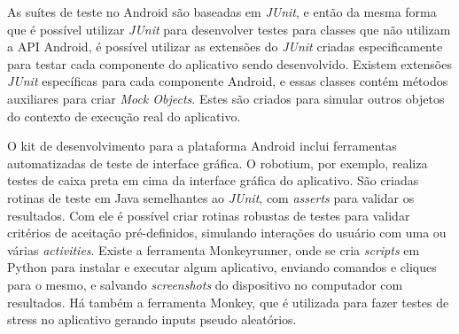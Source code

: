\begin{apendicesenv}
As suítes de teste no Android são baseadas em \textit{JUnit}, e então da mesma forma que é possível utilizar \textit{JUnit} para desenvolver testes para classes que não utilizam a API Android, é possível utilizar as extensões do \textit{JUnit} criadas especificamente para testar cada componente do aplicativo sendo desenvolvido. Existem extensões \textit{JUnit} específicas para cada componente Android, e essas classes contém métodos auxiliares para criar \textit{Mock Objects}. Estes são criados para simular outros objetos do contexto de execução real do aplicativo.

O kit de desenvolvimento para a plataforma Android inclui ferramentas automatizadas de teste de interface gráfica. O robotium, por exemplo, realiza testes de caixa preta em cima da interface gráfica do aplicativo. São criadas rotinas de teste em Java semelhantes ao \textit{JUnit}, com \textit{asserts} para validar os resultados. Com ele é possível criar rotinas robustas de testes para validar critérios de aceitação pré-definidos, simulando interações do usuário com uma ou várias \textit{activities}. Existe a ferramenta Monkeyrunner, onde se cria \textit{scripts} em Python para instalar e executar algum aplicativo, enviando comandos e cliques para o mesmo, e salvando \textit{screenshots} do dispositivo no computador com resultados. Há também a ferramenta Monkey, que é utilizada para fazer testes de stress no aplicativo gerando inputs pseudo aleatórios.



\end{apendicesenv}
